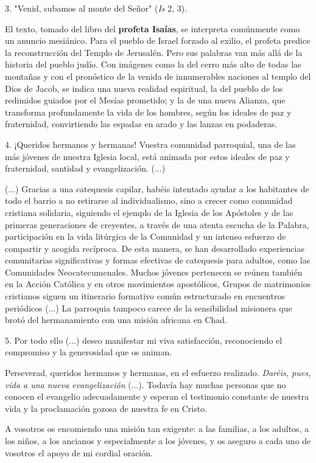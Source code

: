 3. "Venid, subamos al monte del Señor" (\emph{Is} 2, 3).

El texto, tomado del libro del \textbf{profeta Isaías}, se interpreta
comúnmente como un anuncio mesiánico. Para el pueblo de Israel forzado
al exilio, el profeta predice la reconstrucción del Templo de Jerusalén.
Pero sus palabras van más allá de la historia del pueblo judío. Con
imágenes como la del cerro más alto de todas las montañas y con el
pronóstico de la venida de innumerables naciones al templo del Dios de
Jacob, se indica una nueva realidad espiritual, la del pueblo de los
redimidos guiados por el Mesías prometido; y la de una nueva Alianza,
que transforma profundamente la vida de los hombres, según los ideales
de paz y fraternidad, convirtiendo las espadas en arado y las lanzas en
podaderas.

4. ¡Queridos hermanos y hermanas! Vuestra comunidad parroquial, una de
las más jóvenes de nuestra Iglesia local, está animada por estos ideales
de paz y fraternidad, santidad y evangelización. (...)

(...) Gracias a una catequesis capilar, habéis intentado ayudar a los
habitantes de todo el barrio a no retirarse al individualismo, sino a
crecer como comunidad cristiana solidaria, siguiendo el ejemplo de la
Iglesia de los Apóstoles y de las primeras generaciones de creyentes, a
través de una atenta escucha de la Palabra, participación en la vida
litúrgica de la Comunidad y un intenso esfuerzo de compartir y acogida
recíproca. De esta manera, se han desarrollado experiencias comunitarias
significativas y formas efectivas de catequesis para adultos, como las
Comunidades Neocatecumenales. Muchos jóvenes pertenecen se reúnen
también en la Acción Católica y en otros movimientos apostólicos, Grupos
de matrimonios cristianos siguen un itinerario formativo común
estructurado en encuentros periódicos (...) La parroquia tampoco carece
de la sensibilidad misionera que brotó del hermanamiento con una misión
africana en Chad.

5. Por todo ello (...) deseo manifestar mi viva satisfacción,
reconociendo el compromiso y la generosidad que os animan.

Perseverad, queridos hermanos y hermanas, en el esfuerzo realizado.
\emph{Daréis, pues, vida a una nueva evangelización} (...). Todavía hay
muchas personas que no conocen el evangelio adecuadamente y esperan el
testimonio constante de nuestra vida y la proclamación gozosa de nuestra
fe en Cristo.

A vosotros os encomiendo una misión tan exigente: a las familias, a los
adultos, a los niños, a los ancianos y especialmente a los jóvenes, y os
aseguro a cada uno de vosotros el apoyo de mi cordial oración.

